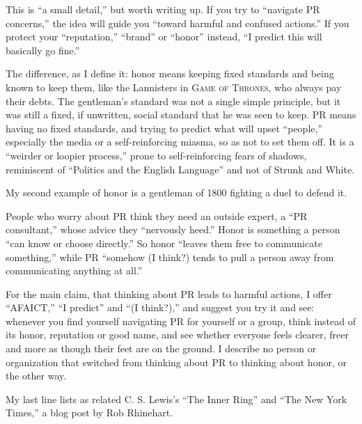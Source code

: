 
This is ``a small detail,'' but worth writing up. If you try to ``navigate PR concerns,'' the idea will guide you ``toward harmful and confused actions.'' If you protect your ``reputation,'' ``brand'' or ``honor'' instead, ``I predict this will basically go fine.''

The difference, as I define it: honor means keeping fixed standards and being known to keep them, like the Lannisters in \textsc{Game of Thrones}, who always pay their debts. The gentleman's standard was not a single simple principle, but it was still a fixed, if unwritten, social standard that he was seen to keep. PR means having no fixed standards, and trying to predict what will upset ``people,'' especially the media or a self-reinforcing miasma, so as not to set them off. It is a ``weirder or loopier process,'' prone to self-reinforcing fears of shadows, reminiscent of ``Politics and the English Language'' and not of Strunk and White. 

My second example of honor is a gentleman of 1800 fighting a duel to defend it. 

People who worry about PR think they need an outside expert, a ``PR consultant,'' whose advice they ``nervously heed.'' Honor is something a person ``can know or choose directly.'' So honor ``leaves them free to communicate something,'' while PR ``somehow (I think?) tends to pull a person away from communicating anything at all.''

For the main claim, that thinking about PR leads to harmful actions, I offer ``AFAICT,'' ``I predict'' and ``(I think?),'' and suggest you try it and see: whenever you find yourself navigating PR for yourself or a group, think instead of its honor, reputation or good name, and see whether everyone feels clearer, freer and more as though their feet are on the ground. I describe no person or organization that switched from thinking about PR to thinking about honor, or the other way.

My last line lists as related C. S. Lewis's ``The Inner Ring'' and ``The New York Times,'' a blog post by Rob Rhinehart. 

